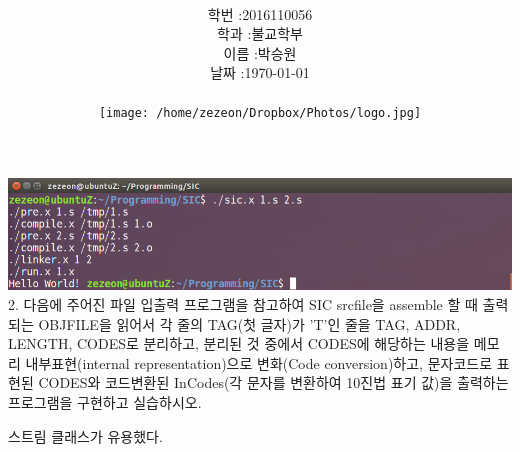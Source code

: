 \documentclass[12pt,a4paper]{article}
\title{
	\centering
	\pgfornament[width=12cm,color=teal]{84}\\
	\vspace{1cm}
	\fontsize{50}{50} \selectfont {동국 SW 공모대전\\SIC emulator 설명서}\\
	\pgfornament[width=12cm,color=teal]{88}\\
	\vfill}
\author{
	\LARGE
	\begin{tabular}{rl}
		\hline
		학번 : & 2016110056\\ 
		학과 : & 불교학부 \\
		이름 : & 박승원\\
		날짜 : & \today\\
		\hline
	\end{tabular}\vspace{2cm}
	\\
	\texttt{[image: /home/zezeon/Dropbox/Photos/logo.jpg]}
}
\date{}
\begin{document}
\maketitle
\newpage
\noindent
\lstset{columns=flexible, tabsize=4, frame=single, showstringspaces=false, breaklines=true, upquote=true}

\lstset{language=C++}







\includegraphics[width=\textwidth]{hello.png}
2. 다음에 주어진 파일 입출력 프로그램을 참고하여 SIC srcfile을 assemble 할 때 출력되는 OBJFILE을 읽어서 각 줄의 TAG(첫 글자)가 'T'인 줄을 TAG, ADDR, LENGTH, CODES로 분리하고, 분리된 것 중에서 CODES에 해당하는 내용을 메모리 내부표현(internal representation)으로 변화(Code conversion)하고, 문자코드로 표현된 CODES와 코드변환된 InCodes(각 문자를 변환하여 10진법 표기 값)을 출력하는 프로그램을 구현하고 실습하시오.

\vspace{1cm}


{}
\indent
스트림 클래스가 유용했다. 
\end{document}
